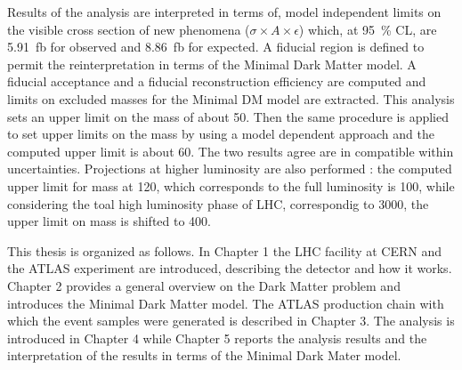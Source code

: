 Results of the \mph analysis are interpreted in terms of, model independent limits on the visible cross section of new phenomena ($\sigma\times A\times\epsilon$) which, at \SI{95}{\percent} CL, are \SI{5.91}{fb} for observed and \SI{8.86}{fb} for expected. A fiducial region is defined to permit the reinterpretation in terms of the Minimal Dark Matter model. A fiducial acceptance and a fiducial reconstruction efficiency are computed and limits on excluded masses for the Minimal DM model are extracted. This analysis sets an upper limit on the \chizero mass of about \SI{50}{\gev}.
Then the same procedure is applied to set upper limits on the \chizero mass by using a model dependent approach and the computed upper limit is about \SI{60}{\gev}. The two results agree are in compatible within uncertainties.
Projections at higher luminosity are also performed : the computed upper limit for \chizero mass at \SI{120}{\ifb}, which corresponds to the full \RunTwo luminosity is \SI{100}{\gev}, while considering the toal high luminosity phase of LHC, correspondig to \SI{3000}{\ifb}, the upper limit on \chizero mass is shifted to \SI{400}{\gev}.

\bigskip
  
This thesis is organized as follows. In Chapter 1 the LHC facility at CERN and the ATLAS experiment are introduced, describing the detector and how it works. Chapter 2 provides a general overview on the Dark Matter problem and introduces the Minimal Dark Matter model. The ATLAS production chain with which the event samples were generated is described in Chapter 3. The \mph analysis is introduced in Chapter 4 while Chapter 5 reports the analysis results and the interpretation of the \mph results in terms of the Minimal Dark Mater model.



